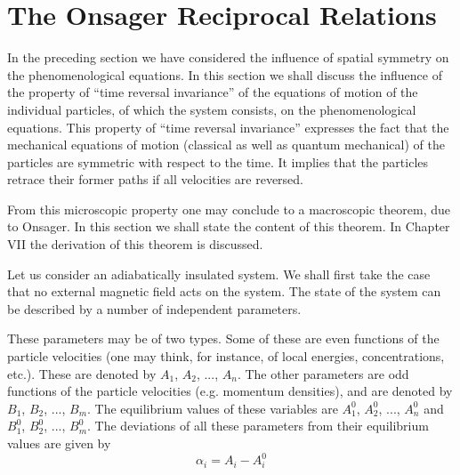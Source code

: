 \section{The Onsager Reciprocal Relations}

In the preceding section we have considered the influence of spatial symmetry on the phenomenological equations. In this section we shall discuss the influence of the property of ``time reversal invariance'' of the equations of motion of the individual particles, of which the system consists, on the phenomenological equations. This property of ``time reversal invariance'' expresses the fact that the mechanical equations of motion (classical as well as quantum mechanical) of the particles are symmetric with respect to the time. It implies that the particles retrace their former paths if all velocities are reversed.

From this microscopic property one may conclude to a macroscopic theorem, due to Onsager. In this section we shall state the content of this theorem. In Chapter VII the derivation of this theorem is discussed.

Let us consider an adiabatically insulated system. We shall first take the case that no external magnetic field acts on the system. The state of the system can be described by a number of independent parameters.

These parameters may be of two types. Some of these are even functions of the particle velocities (one may think, for instance, of local energies, concentrations, etc.). These are denoted by $A_1$, $A_2$, ..., $A_n$. The other parameters are odd functions of the particle velocities (e.g. momentum densities), and are denoted by $B_1$, $B_2$, ..., $B_m$. The equilibrium values of these variables are $A_1^0$, $A_2^0$, ..., $A_n^0$ and $B_1^0$, $B_2^0$, ..., $B_m^0$. The deviations of all these parameters from their equilibrium values are given by
\begin{equation}
\alpha_i = A_i - A_i^0
    \label{eq:IV.24}
\end{equation}

